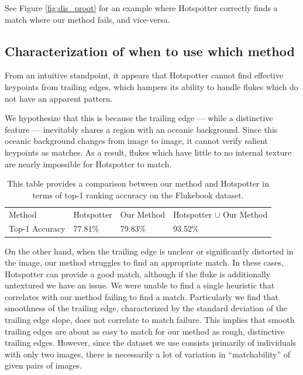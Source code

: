 See Figure \ref{fig:dis_proot} for an example where Hotspotter correctly finds a match where our method fails, and vice-versa.

\subsection{Characterization of when to use which method}

From an intuitive standpoint, it appears that Hotspotter cannot find effective keypoints from trailing edges, which hampers its ability to handle flukes which do not have an apparent pattern.

We hypothesize that this is because the trailing edge --- while a distinctive feature --- inevitably shares a region with an oceanic background.
Since this oceanic background changes from image to image, it cannot verify salient keypoints as matches.
As a result, flukes which have little to no internal texture are nearly impossible for Hotspotter to match.

\begin{table}[t]%
	\centering
	\resizebox{\linewidth}{!}
	{
		\begin{tabular} {| l || l | l | l |}
		\hline
		Method & Hotspotter & Our Method & Hotspotter $\cup$ Our Method \\
		\hhline{|=#===|}
		Top-1 Accuracy  & 77.81\% & 79.83\% & 93.52\% \\
		\hline
		\end{tabular}
	}
	\caption{This table provides a comparison between our method and Hotspotter in terms of top-1 ranking accuracy on the Flukebook dataset.}
	\label{tab:vary_proot}
\end{table}







On the other hand, when the trailing edge is unclear or significantly distorted in the image, our method struggles to find an appropriate match.
In these cases, Hotspotter can provide a good match, although if the fluke is additionally untextured we have an issue.
We were unable to find a single heuristic that correlates with our method failing to find a match.
Particularly we find that smoothness of the trailing edge, characterized by the standard deviation of the trailing edge slope, does not correlate to match failure.
This implies that smooth trailing edges are about as easy to match for our method as rough, distinctive trailing edges.
However, since the dataset we use consists primarily of individuals with only two images, there is necessarily a lot of variation in ``matchability'' of given pairs of images.


